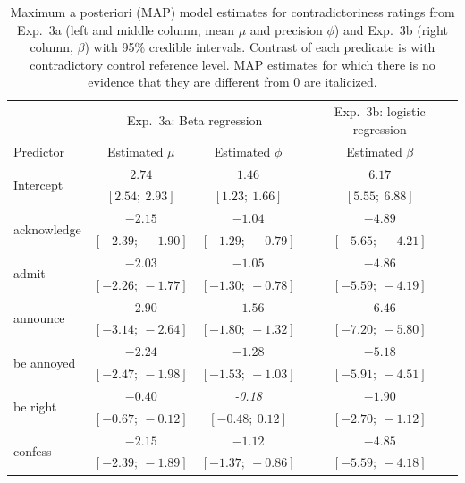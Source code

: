 \documentclass[11pt,fleqn]{article}
\newcommand{\6}{\mbox{$[\hspace*{-.6mm}[$}}
\newcommand{\9}{\mbox{$]\hspace*{-.6mm}]$}}
\begin{document}
\begin{table}
\caption{Maximum a posteriori (MAP) model estimates for contradictoriness ratings from Exp.~3a (left and middle column, mean $\mu$ and precision $\phi$) and Exp.~3b (right column, $\beta$)  with 95\% credible intervals. Contrast of each predicate is with contradictory control reference level. MAP estimates for which there is no evidence that they are different from 0 are italicized.}
\small
\begin{center}
\begin{tabular}{l c c c}
\toprule
& \multicolumn{2}{c}{Exp.~3a: Beta regression} & Exp.~3b: logistic regression \\
Predictor & Estimated $\mu$ & Estimated $\phi$ & Estimated $\beta$\\
\midrule
\multirow{2}{*}{Intercept}             & $2.74$        & $1.46$        & $6.17$          \\
                         & $[2.54;\ 2.93]$   & $[1.23;\ 1.66]$   & $[5.55;\ 6.88]$     \\
\multirow{2}{*}{acknowledge}       & $-2.15$       & $-1.04$       & $-4.89$         \\
                         & $[-2.39;\ -1.90]$ & $[-1.29;\ -0.79]$ & $[-5.65;\ -4.21]$   \\
\multirow{2}{*}{admit}             & $-2.03$       & $-1.05$       & $-4.86$         \\
                         & $[-2.26;\ -1.77]$ & $[-1.30;\ -0.78]$ & $[-5.59;\ -4.19]$   \\
\multirow{2}{*}{announce}          & $-2.90$       & $-1.56$       & $-6.46$         \\
                         & $[-3.14;\ -2.64]$ & $[-1.80;\ -1.32]$ & $[-7.20;\ -5.80]$   \\
\multirow{2}{*}{be annoyed}       & $-2.24$       & $-1.28$       & $-5.18$         \\
                         & $[-2.47;\ -1.98]$ & $[-1.53;\ -1.03]$ & $[-5.91;\ -4.51]$   \\
\multirow{2}{*}{be right}         & $-0.40$       & \emph{-0.18}           & $-1.90$         \\
                         & $[-0.67;\ -0.12]$ & $[-0.48;\ 0.12]$  & $[-2.70;\ -1.12]$   \\
\multirow{2}{*}{confess}           & $-2.15$       & $-1.12$       & $-4.85$         \\
                         & $[-2.39;\ -1.89]$ & $[-1.37;\ -0.86]$ & $[-5.59;\ -4.18]$   \\

\end{tabular}
\end{center}
\end{table}
\end{document}
